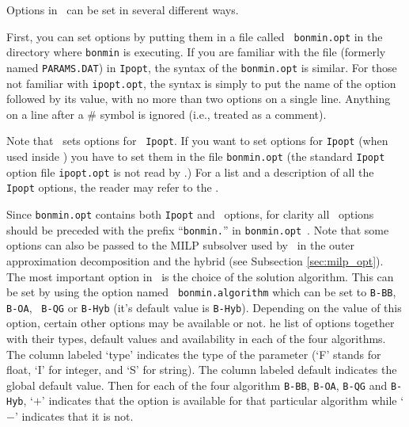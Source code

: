 
\begin{PageSummary}
\end{PageSummary}


Options in \Bonmin\ can be set in several different ways.

First, you can set options by putting them in a file called {\tt
bonmin.opt} in the directory where {\tt bonmin} is executing. If you
are familiar with the file
 (formerly named {\tt PARAMS.DAT}) in {\tt Ipopt}, the
syntax of the {\tt bonmin.opt} is similar. For those not familiar
with {\tt ipopt.opt}, the syntax is simply to put the name of the
option followed by its value, with no more than two options on a
single line. Anything on a line after a \# symbol is ignored (i.e.,
treated as a comment).

Note that \Bonmin\ sets options for {\tt
Ipopt}. If you want to set options for {\tt Ipopt} (when used inside \Bonmin) you have to set them
in the file {\tt bonmin.opt} (the standard {\tt Ipopt} option file {\tt ipopt.opt}
is not read by \Bonmin.)
For a list and a description of all the {\tt Ipopt} options, the
reader may refer to the
.

Since {\tt bonmin.opt} contains both {\tt Ipopt} and \Bonmin\ options, for clarity
all \Bonmin\ options should be preceded with the prefix ``{\tt bonmin.}'' in {\tt bonmin.opt}~.
Note that some options can also be passed to the MILP subsolver used by \Bonmin\
in the outer approximation decomposition
and the hybrid (see Subsection \ref{sec:milp_opt}).\\

The most important option in \Bonmin\ is the choice of the solution
algorithm. This can be set by using the option named {\tt
bonmin.algorithm} which can be set to {\tt B-BB}, {\tt B-OA}, {\tt
B-QG} or {\tt B-Hyb} (it's default value is {\tt B-Hyb}). Depending
on the value of this option, certain other options may be available
or not. \latexhtml{Table \ref{tab:options} gives t}{T}he list of options together
with their types, default values and availability in each of the
four algorithms. The column labeled `type' indicates the type of the
parameter (`F' stands for float, `I' for integer, and `S' for
string). The column labeled default indicates the global default
value. Then for each of the four algorithm {\tt B-BB}, {\tt B-OA},
{\tt B-QG} and {\tt B-Hyb}, `$+$' indicates that the option is
available for that particular algorithm
while `$-$' indicates that it is not.\\

